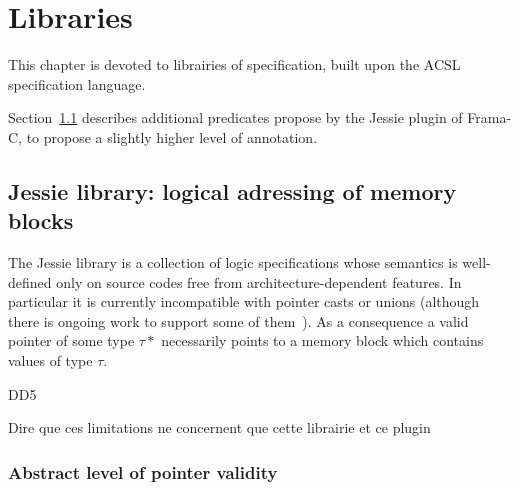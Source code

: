 \chapter{Libraries}
\label{chap:lib}

This chapter is devoted to librairies of specification, built upon the ACSL specification language.

Section~\ref{sec:jessie} describes additional predicates propose by the Jessie plugin of Frama-C, to propose a slightly higher level of annotation.


%

\section{Jessie library: logical adressing of memory blocks}
\label{sec:jessie}


The Jessie library is a collection of logic specifications whose
semantics is well-defined only on source codes free from
architecture-dependent features. In particular it is currently
incompatible with pointer casts or unions (although there is ongoing
work to support some of them~\cite{moy07ccpp}). As a consequence a
valid pointer of some type $\tau*$ necessarily points to a memory
block which contains values of type $\tau$.

\begin{remark}{DD5}

Dire que ces limitations ne concernent que cette librairie et ce plugin

\end{remark}


\subsection{Abstract level of pointer validity}


